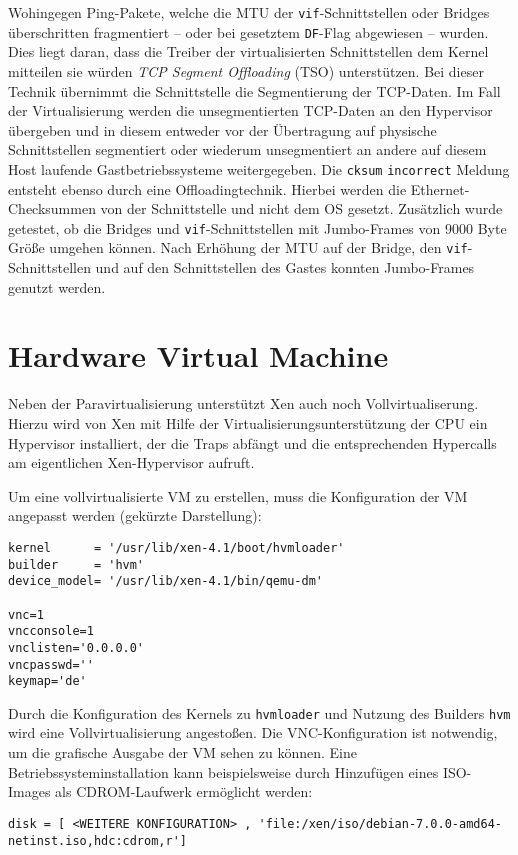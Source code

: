 Wohingegen Ping-Pakete, welche die MTU der \verb#vif#-Schnittstellen oder Bridges überschritten fragmentiert -- oder bei gesetztem \verb#DF#-Flag abgewiesen -- wurden.
Dies liegt daran, dass die Treiber der virtualisierten Schnittstellen dem Kernel mitteilen sie würden \emph{TCP Segment Offloading} (TSO) unterstützen. Bei dieser Technik übernimmt die Schnittstelle die Segmentierung der TCP-Daten. Im Fall der Virtualisierung werden die unsegmentierten TCP-Daten an den Hypervisor übergeben und in diesem entweder vor der Übertragung auf physische Schnittstellen segmentiert oder wiederum unsegmentiert an andere auf diesem Host laufende Gastbetriebssysteme weitergegeben. Die \verb#cksum# \verb#incorrect# Meldung entsteht ebenso durch eine Offloadingtechnik. Hierbei werden die Ethernet-Checksummen von der Schnittstelle und nicht dem OS gesetzt. 
Zusätzlich wurde getestet, ob die Bridges und \verb#vif#-Schnittstellen mit Jumbo-Frames von 9000 Byte Größe umgehen können. Nach Erhöhung der MTU auf der Bridge, den \verb#vif#-Schnittstellen und auf den Schnittstellen des Gastes konnten Jumbo-Frames genutzt werden.

\section{Hardware Virtual Machine}
\label{hvm_vm}
Neben der Paravirtualisierung unterstützt Xen auch noch Vollvirtualiserung. Hierzu wird von Xen mit Hilfe der Virtualisierungsunterstützung der CPU ein Hypervisor installiert, der die Traps abfängt und die entsprechenden Hypercalls am eigentlichen Xen-Hypervisor aufruft.

Um eine vollvirtualisierte VM zu erstellen, muss die Konfiguration der VM angepasst werden (gekürzte Darstellung):
\setupVerbatimOut
\begin{verbatim}
kernel      = '/usr/lib/xen-4.1/boot/hvmloader'
builder     = 'hvm'
device_model= '/usr/lib/xen-4.1/bin/qemu-dm'

vnc=1
vncconsole=1
vnclisten='0.0.0.0'
vncpasswd=''
keymap='de'
\end{verbatim}

Durch die Konfiguration des Kernels zu \verb#hvmloader# und Nutzung des Builders \verb#hvm# wird eine Vollvirtualisierung angestoßen. Die VNC-Konfiguration ist notwendig, um die grafische Ausgabe der VM sehen zu können. Eine Betriebssysteminstallation kann beispielsweise durch Hinzufügen eines ISO-Images als CDROM-Lauf\-werk ermöglicht werden: 
\setupVerbatimOut
\begin{verbatim}
disk = [ <WEITERE KONFIGURATION> , 'file:/xen/iso/debian-7.0.0-amd64-netinst.iso,hdc:cdrom,r']
\end{verbatim}

